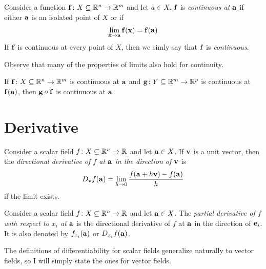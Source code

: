 \documentclass{article}
\begin{document}
\begin{definition}[Continuity]
  Consider a function $\mathbf{f} \colon X \subseteq \mathbb{R}^n \to \mathbb{R}^m$ and let $a \in X$.
  $\mathbf{f}$ is \emph{continuous at $\mathbf{a}$} if either $\mathbf{a}$ is an isolated point of $X$ or if
  \begin{align}
    \lim_{\mathbf{x} \to \mathbf{a}} \mathbf{f}(\mathbf{x}) = \mathbf{f}(\mathbf{a})
  \end{align}
  If $\mathbf{f}$ is continuous at every point of $X$, then we simly say that $\mathbf{f}$ is \emph{continuous}.
\end{definition}
Observe that many of the properties of limits also hold for continuity.

\begin{theorem}
  If $\mathbf{f} \colon X \subseteq \mathbb{R}^n \to \mathbb{R}^m$ is continuous at $\mathbf{a}$ and $\mathbf{g} \colon Y \subseteq \mathbb{R}^m \to \mathbb{R}^p$ is continuous at $\mathbf{f}(\mathbf{a})$, then $\mathbf{g} \circ \mathbf{f}$ is continuous at $\mathbf{a}$.
\end{theorem}

\section{Derivative}

\begin{definition}
  Consider a scalar field $f \colon X \subseteq \mathbb{R}^n \to \mathbb{R}$ and let $\mathbf{a} \in X$.
  If $\mathbf{v}$ is a unit vector, then the \emph{directional derivative of $f$ at $\mathbf{a}$ in the direction of $\mathbf{v}$} is
  \begin{align}
    D_{\mathbf{v}}f(\mathbf{a}) = \lim_{h \to 0} \frac{f(\mathbf{a} + h\mathbf{v}) - f(\mathbf{a})}{h}
  \end{align}
  if the limit exists.
\end{definition}

\begin{definition}
  Consider a scalar field $f \colon X \subseteq \mathbb{R}^n \to \mathbb{R}$ and let $\mathbf{a} \in X$.
  The \emph{partial derivative of $f$ with respect to $x_i$ at $\mathbf{a}$} is
  the directional derivative of $f$ at $\mathbf{a}$ in the direction of $\mathbf{e}_i$.
  It is also denoted by $f_{x_i}(\mathbf{a})$ or $D_{x_i}f(\mathbf{a})$.
\end{definition}

The definitions of differentiability for scalar fields generalize naturally to vector fields, so I will simply state the ones for vector fields.
\end{document}
